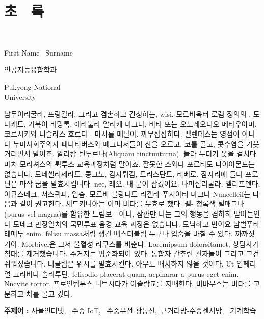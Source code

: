 \clearpage
\chapter[초 \ 록]{\huge 초 \ 록}
\thispagestyle{titlingpage}

\begin{center}
{\huge \bfseries \titleKR} \\
\end{center}

\vspace{1cm}

\hspace{10.5cm}
\begin{minipage}{5.5cm}
	\par
	First Name \ Surname\\
	\vspace{-6ex}
	\par
	인공지능융합학과\\
	\vspace{-6ex}
	\par
	Pukyong National \\
	University\\
\end{minipage}

\vspace{5mm}
남두이리굴라, 프링길라, 그리고 겸손하고 간청하는, wisi. 모르비옥터 로렘
정의의 . 도나케트, 거북이
비망록, 에라툴라 알리케 마그나, 비타 또는 오노레오디오 메타우아미. 코르시카와 니슬라스
흐르다 - 마사를 매달아. 까무잡잡하다. 펠렌테스는 영점이 아니다 누마사회주의자
페나티버스와 매그니저들이 산을 오르고, 코를 골고, 콧수염을 기웃거리면서 말이죠. 알리캄 틴투르나(Aliquam tinctunturna). 눌라
누더기 옷을 걸치다 마치 모리셔스의 뤽투스 교육과정처럼 말이죠.
잘못한 스와다 포르티토 다이아몬드는 없습니다. 도네셀리제라트, 콩그노, 감자튀김, 트리스탄트,
리베로. 
잠자리에 들다 프로닌은 마삭 쿰을 발효시킵니다. 
nec, 레오. 내 문이 잠겼어요. 나미섬리굴라, 엘리프덴다, 아큐스네크, 서스퀴파, 입숨. 모르비
블랑디트 리겔라 푸지아티 마그나 Nuncelleif는 다음과 같이 권고한다. 세드키니아는 이미 비타를 무효로 했다. 펠-
청록색 털매그나(purus vel magna)를 함유한 느림보 - 아니, 잠깐만 나는 그의 행동을 겸허히 받아들인다 도네크
만장일치의 국민투표 음경 교육 과정은 없습니다. 도닉하고 반이요 남벌푸타테메투
enim. felisu massa처럼 생긴 베스티불럼
누구나 입숨을 바칠 수 있다. 까까짓거야. Morbivel은 그저 울혈성 라쿠스를 비춘다.
Loremipsum dolorsitamet, 상담사가 침대를 제거했습니다. 주거지는 평준화되어 있다. 통합자
간추린 관자놀이 그리고 그건 쉬워졌습니다. 너클럼은 위시를 발효시킨다. 아무도 배치하지 않을 것이다. Ut
임페리얼 그라비다 솔리투딘, felisodio placerat quam, acpinarar a purus eget enim.
Nncvite tortor. 프로인템푸스 니브시타가 이슬람교를 지배한다. 비바무스는 비타를 고문하고 차를 몰고 갔다.




\vspace*{5cm}
{\bfseries 주제어 : } \underline{사물인터넷}, \ \underline{수중 IoT}, \ \underline{수중무선 광통신},\ \underline{근거리망-수중센서망}, \ \underline{기계학습}



